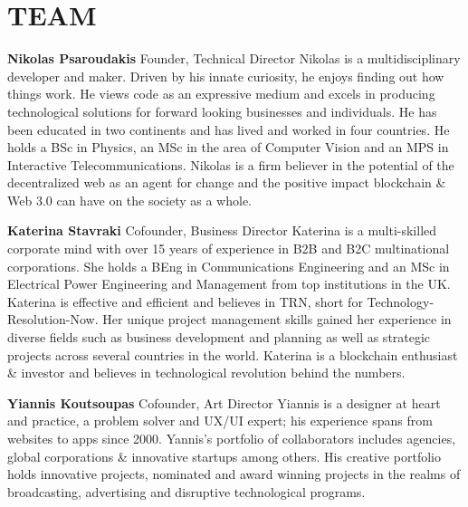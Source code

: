 \newpage
\section{TEAM} \label{team}
\bigskip
\noindent
\textbf{Nikolas Psaroudakis} \newline
\medskip Founder, Technical Director
\newline
Nikolas is a multidisciplinary developer and maker. Driven by his innate curiosity, he enjoys finding out how things work. He views code as an expressive medium and excels in producing technological solutions for forward looking businesses and individuals. He has been educated in two continents and has lived and worked in four countries. He holds a BSc in Physics, an MSc in the area of Computer Vision and an MPS in Interactive Telecommunications. Nikolas is a firm believer in the potential of the decentralized web as an agent for change and the positive impact blockchain \& Web 3.0 can have on the society as a whole.\par

\bigskip
\noindent
\textbf{Katerina Stavraki}\newline
\medskip Cofounder, Business Director
\newline
Katerina is a multi-skilled corporate mind with over 15 years of experience in B2B and B2C multinational corporations. She holds a BEng in Communications Engineering and an MSc in Electrical Power Engineering and Management from top institutions in the UK. Katerina is effective and efficient and believes in TRN, short for Technology-Resolution-Now. Her unique project management skills gained her experience in diverse fields such as business development and planning as well as strategic projects across several countries in the world. Katerina is a blockchain enthusiast \& investor and believes in technological revolution behind the numbers.\par


\bigskip
\noindent
\textbf{Yiannis Koutsoupas}\newline
\medskip Cofounder, Art Director
\newline
Yiannis is a designer at heart and practice, a problem solver and UX/UI expert; his experience spans from websites to apps since 2000. Yannis’s portfolio of collaborators includes agencies, global corporations \& innovative startups among others. His creative portfolio holds innovative projects, nominated and award winning projects in the realms of broadcasting, advertising and disruptive technological programs.
 \par

